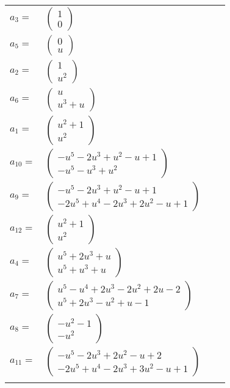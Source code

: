 \documentclass[1p]{elsarticle_modified}
\theoremstyle{definition}
\begin{document}
\begin{tabular}{m{7pt} m{180pt} m{7pt} m{180pt} }
\flushright $a_{3}=$&$\begin{pmatrix}1\\0\end{pmatrix}$ \\
\flushright $a_{5}=$&$\begin{pmatrix}0\\u\end{pmatrix}$ \\
\flushright $a_{2}=$&$\begin{pmatrix}1\\u^2\end{pmatrix}$ \\
\flushright $a_{6}=$&$\begin{pmatrix}u\\u^3+u\end{pmatrix}$ \\
\flushright $a_{1}=$&$\begin{pmatrix}u^2+1\\u^2\end{pmatrix}$ \\
\flushright $a_{10}=$&$\begin{pmatrix}- u^5-2 u^3+u^2- u+1\\- u^5- u^3+u^2\end{pmatrix}$ \\
\flushright $a_{9}=$&$\begin{pmatrix}- u^5-2 u^3+u^2- u+1\\-2 u^5+u^4-2 u^3+2 u^2- u+1\end{pmatrix}$ \\
\flushright $a_{12}=$&$\begin{pmatrix}u^2+1\\u^2\end{pmatrix}$ \\
\flushright $a_{4}=$&$\begin{pmatrix}u^5+2 u^3+u\\u^5+u^3+u\end{pmatrix}$ \\
\flushright $a_{7}=$&$\begin{pmatrix}u^5- u^4+2 u^3-2 u^2+2 u-2\\u^5+2 u^3- u^2+u-1\end{pmatrix}$ \\
\flushright $a_{8}=$&$\begin{pmatrix}- u^2-1\\- u^2\end{pmatrix}$ \\
\flushright $a_{11}=$&$\begin{pmatrix}- u^5-2 u^3+2 u^2- u+2\\-2 u^5+u^4-2 u^3+3 u^2- u+1\end{pmatrix}$\\&\end{tabular}
\end{document}
